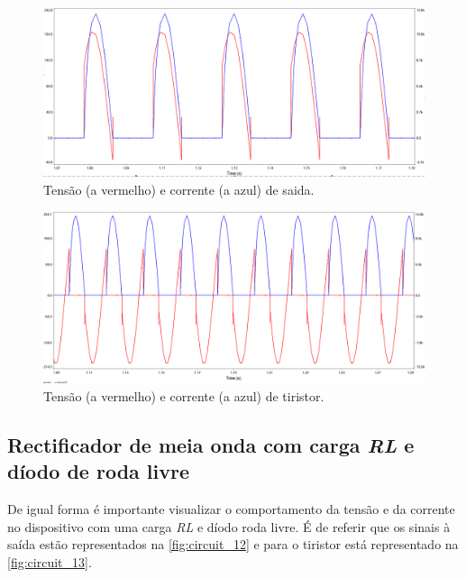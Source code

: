 \documentclass[a4paper,11pt]{article}
\numberwithin{equation}{section}
\begin{document}
\begin{figure}[h]
	\centering
	\includegraphics[keepaspectratio=true, scale=0.35]{img/circuito8}
	\caption{Tensão (a vermelho) e corrente (a azul) de saida.}
	\label{fig:circuit_10}
	\vspace{-0.8em}
\end{figure}

\begin{figure}[h]
	\centering
	\includegraphics[keepaspectratio=true, scale=0.35]{img/circuito9}
	\caption{Tensão (a vermelho) e corrente (a azul) de tiristor.}
	\label{fig:circuit_11}
	\vspace{-0.8em}
\end{figure}

\subsection{Rectificador de meia onda com carga \textit{RL} e díodo de roda livre}
De igual forma é importante visualizar o comportamento da tensão e da corrente no dispositivo com uma carga \textit{RL} e díodo roda livre. É de referir que os sinais à saída estão representados na \autoref{fig:circuit_12} e para o tiristor está representado na \autoref{fig:circuit_13}.
\end{document}

